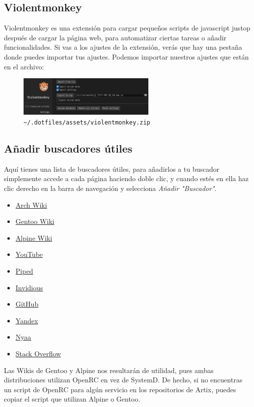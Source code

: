 \documentclass[11pt]{article}
\begin{document}
\subsection{Violentmonkey}

Violentmonkey es una extensión para cargar pequeños scripts de javascript justop después de cargar la página web, para automatizar ciertas tareas o añadir funcionalidades. Si vas a los ajustes de la extensión, verás que hay una pestaña donde puedes importar tus ajustes. Podemos importar nuestros ajustes que están en el archivo:

\begin{figure}[h!]
	\captionsetup{labelformat=empty}
	\centering
	\includegraphics[width=0.6\textwidth]{images/violentmonkey.jpg}
	\cprotect\caption{\verb|~/.dotfiles/assets/violentmonkey.zip|}
\end{figure}

\vspace{-20pt}

\subsection{Añadir buscadores útiles}

Aquí tienes una lista de buscadores útiles, para añadirlos a tu buscador simplemente accede a cada página haciendo doble clic, y cuando estés en ella haz clic derecho en la barra de navegación y selecciona \textit{Añadir "Buscador"}.

\begin{multicols}{5}
\scriptsize
\begin{itemize}
\setlength\itemindent{-0.75em}
\setlength\itemsep{-0.35em}
\item \href{https://wiki.archlinux.org/}{Arch Wiki}
\item \href{https://wiki.gentoo.org/wiki/Main_Page}{Gentoo Wiki}
\item \href{https://wiki.alpinelinux.org/wiki/Main_Page}{Alpine Wiki}
\item \href{https://www.youtube.com/}{YouTube}
\item \href{https://nyc1.pi.ggtyler.dev/trending}{Piped}
\item \href{https://iv.ggtyler.dev/feed/popular}{Invidious}
\item \href{https://github.com/}{GitHub}
\item \href{https://yandex.com/}{Yandex}
\item \href{https://nyaa.si/}{Nyaa}
\item \href{https://stackoverflow.com/}{Stack Overflow}
\end{itemize}
\end{multicols}

Las Wikis de Gentoo y Alpine nos resultarán de utilidad, pues ambas distribuciones utilizan OpenRC en vez de SystemD. De hecho, si no encuentras un script de OpenRC para algún servicio en los repositorios de Artix, puedes copiar el script que utilizan Alpine o Gentoo.
\end{document}
